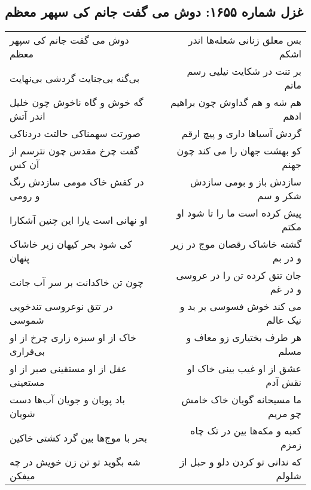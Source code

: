 \begin{center}
\section*{غزل شماره ۱۶۵۵: دوش می گفت جانم کی سپهر معظم}
\label{sec:1655}
\begin{longtable}{l p{0.5cm} r}
دوش می گفت جانم کی سپهر معظم
&&
بس معلق زنانی شعله‌ها اندر اشکم
\\
بی‌گنه بی‌جنایت گردشی بی‌نهایت
&&
بر تنت در شکایت نیلیی رسم ماتم
\\
گه خوش و گاه ناخوش چون خلیل اندر آتش
&&
هم شه و هم گداوش چون براهیم ادهم
\\
صورتت سهمناکی حالتت دردناکی
&&
گردش آسیاها داری و پیچ ارقم
\\
گفت چرخ مقدس چون نترسم از آن کس
&&
کو بهشت جهان را می کند چون جهنم
\\
در کفش خاک مومی سازدش رنگ و رومی
&&
سازدش باز و بومی سازدش شکر و سم
\\
او نهانی است یارا این چنین آشکارا
&&
پیش کرده است ما را تا شود او مکتم
\\
کی شود بحر کیهان زیر خاشاک پنهان
&&
گشته خاشاک رقصان موج در زیر و در بم
\\
چون تن خاکدانت بر سر آب جانت
&&
جان تتق کرده تن را در عروسی و در غم
\\
در تتق نوعروسی تندخویی شموسی
&&
می کند خوش فسوسی بر بد و نیک عالم
\\
خاک از او سبزه زاری چرخ از او بی‌قراری
&&
هر طرف بختیاری زو معاف و مسلم
\\
عقل از او مستقینی صبر از او مستعینی
&&
عشق از او غیب بینی خاک او نقش آدم
\\
باد پویان و جویان آب‌ها دست شویان
&&
ما مسیحانه گویان خاک خامش چو مریم
\\
بحر با موج‌ها بین گرد کشتی خاکین
&&
کعبه و مکه‌ها بین در تک چاه زمزم
\\
شه بگوید تو تن زن خویش در چه میفکن
&&
که ندانی تو کردن دلو و حبل از شلولم
\\
\end{longtable}
\end{center}
